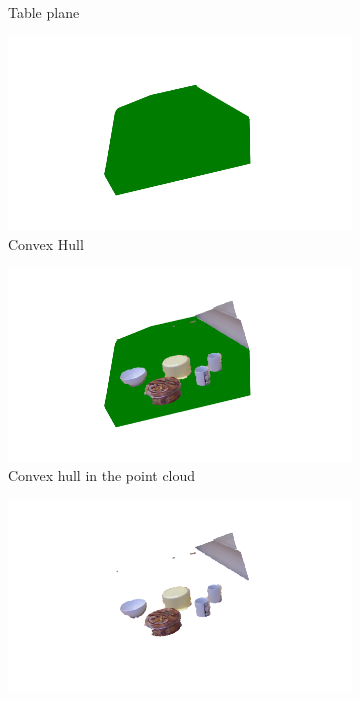 \begin{figure}[tb]
\begin{subfigure}[t]{0.32\textwidth}
\caption{Table plane}\label{img:obj_plane}
\end{subfigure}
\begin{subfigure}[t]{0.32\textwidth}
\includegraphics[width = 1.1\textwidth]{Img/ObjectSegmentation/convex_hull.png}
\caption{Convex Hull}\label{img:obj_conex_hull}
\end{subfigure}
\begin{subfigure}[t]{0.32\textwidth}
\includegraphics[width = 1.1\textwidth]{Img/ObjectSegmentation/convex_hull_full.png}
\caption{Convex hull in the point cloud}\label{img:obj_convex_hull_full}
\end{subfigure}
\begin{subfigure}[t]{0.32\textwidth}
\includegraphics[width = 1.1\textwidth]{Img/ObjectSegmentation/tabletop_objects.png}

\end{subfigure}
\end{figure}
